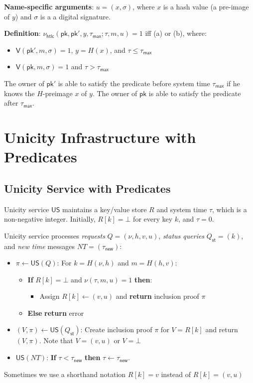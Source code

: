 \documentclass{article}
\newcommand{\sigver}[0]{\mathsf{V}}
\newcommand{\pubkey}[0]{\mathsf{pk}}
\newcommand{\unisrv}[0]{\mathsf{US}}
\begin{document}
\noindent\textbf{Name-specific arguments}: $u=(x,\sigma)$, where $x$ is a hash value (a pre-image of $y$) and $\sigma$ is a a digital signature.\medskip

\noindent\textbf{Definition}: $\nu_\mathsf{htlc}(\pubkey,\pubkey',y,\tau_\mathsf{max};\tau,m,u)=1$ iff  (a) or (b), where:
\begin{itemize}
\item[(a)] $\sigver(\pubkey',m,\sigma)=1$, $y=H(x)$, and $\tau\le \tau_\mathsf{max}$
\item[(b)] $\sigver(\pubkey,m,\sigma)=1$ and $\tau> \tau_\mathsf{max}$
\end{itemize}
\medskip

\noindent
The owner of $\pubkey'$ is able to satisfy the predicate before system time $\tau_\mathsf{max}$ if he knows the $H$-preimage $x$ of $y$.
The owner of $\pubkey$ is able to satisfy the predicate after $\tau_\mathsf{max}$.




\section{Unicity Infrastructure with Predicates}\label{sec:infra}

\subsection{Unicity Service with Predicates}

Unicity service $\unisrv$ maintains a key/value store $R$ and system time $\tau$, which is a non-negative integer. Initially, $R[k]=\bot$ for every key $k$, and $\tau=0$.\medskip

\noindent Unicity service processes \emph{requests} $Q=(\nu,h,v,u)$,  \emph{status queries} $Q_\mathsf{st}=(k)$, and \emph{new time} messages $NT=(\tau_\mathsf{new})$:
\begin{itemize}
\item $\pi\gets\unisrv(Q)$: For $k=H(\nu,h)$ and $m=H(h,v)$:
\begin{itemize}
\item \textbf{If} $R[k]=\bot$ and $\nu(\tau, m, u)=1$ \textbf{then}:
   \begin{itemize}
      \item Assign $R[k]\gets (v,u)$ and \textbf{return} inclusion proof $\pi$
   \end{itemize}
\item \textbf{Else} \textbf{return} error
\end{itemize}
\item $(V,\pi)\gets \unisrv(Q_\mathsf{st})$: Create inclusion proof $\pi$ for $V=R[k]$ and return $(V,\pi)$. Note that $V=(v,u)$ or $V=\bot$
\item $\unisrv(NT)$: \textbf{If} $\tau<\tau_\mathsf{new}$ \textbf{then} $\tau\gets \tau_\mathsf{new}$.
\end{itemize}
Sometimes we use a shorthand notation $R[k]=v$ instead of $R[k]=(v,u)$\medskip
\end{document}
